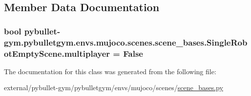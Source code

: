 \subsection{Member Data Documentation}
\subsubsection[{\texorpdfstring{multiplayer}{multiplayer}}]{\setlength{\rightskip}{0pt plus 5cm}bool pybullet-\/gym.\+pybulletgym.\+envs.\+mujoco.\+scenes.\+scene\+\_\+bases.\+Single\+Robot\+Empty\+Scene.\+multiplayer = False\hspace{0.3cm}{\ttfamily [static]}}\hypertarget{classpybullet-gym_1_1pybulletgym_1_1envs_1_1mujoco_1_1scenes_1_1scene__bases_1_1_single_robot_empty_scene_a2e1a7a294083e6af1b20f032aebeef04}{}\label{classpybullet-gym_1_1pybulletgym_1_1envs_1_1mujoco_1_1scenes_1_1scene__bases_1_1_single_robot_empty_scene_a2e1a7a294083e6af1b20f032aebeef04}


The documentation for this class was generated from the following file\+:\begin{DoxyCompactItemize}
\item 
external/pybullet-\/gym/pybulletgym/envs/mujoco/scenes/\hyperlink{mujoco_2scenes_2scene__bases_8py}{scene\+\_\+bases.\+py}\end{DoxyCompactItemize}
